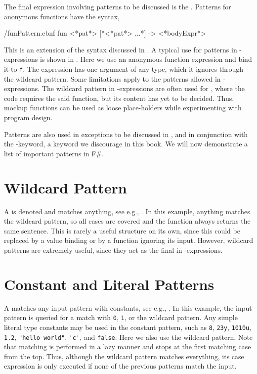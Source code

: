 \documentclass[fsharpNotes.tex]{subfiles}
\begin{document}
The final expression involving patterns to be discussed is the . Patterns for anonymous functions have the syntax,
%
\begin{verbatimwrite}{\ebnf/funPattern.ebnf}
fun <*pat*> [*<*pat*> ...*] -> <*bodyExpr*>
\end{verbatimwrite}
%
This is an extension of the syntax discussed in . A typical use for patterns in -expressions is shown in .
%
%
Here we use an anonymous function expression and bind it to \lstinline{f}. The expression has one argument of any type, which it ignores through the wildcard pattern. Some limitations apply to the patterns allowed in -expressions. The wildcard pattern in -expressions are often used for , where the code requires the said function, but its content has yet to be decided. Thus, mockup functions can be used as loose place-holders while experimenting with program design.

Patterns are also used in exceptions to be discussed in , and in conjunction with the -keyword, a keyword we discourage in this book. We will now demonstrate a list of important patterns in F\#.

\section{Wildcard Pattern}
\label{sec:wildcardPattern}
A  is denoted \idx[_@\lstinline{_}]{\lexeme{_}} and matches anything, see e.g., .
%
%
In this example, anything matches the wildcard pattern, so all cases are covered and the function always returns the same sentence. This is rarely a useful structure on its own, since this could be replaced by a value binding or by a function ignoring its input. However, wildcard patterns are extremely useful, since they act as the final  in -expressions.

\section{Constant and Literal Patterns}
A  matches any input pattern with constants, see e.g., .
%
%
In this example, the input pattern is queried for a match with \lstinline{0}, \lstinline{1}, or the wildcard pattern. Any simple literal type constants may be used in the constant pattern, such as \lstinline{8}, \lstinline{23y}, \lstinline{1010u}, \lstinline{1.2}, \lstinline{"hello world"}, \lstinline{'c'}, and \lstinline{false}.  Here we also use the wildcard pattern. Note that matching is performed in a lazy manner and stops at the first matching case from the top. Thus, although the wildcard pattern matches everything, its case expression is only executed if none of the previous patterns match the input.
\end{document}
